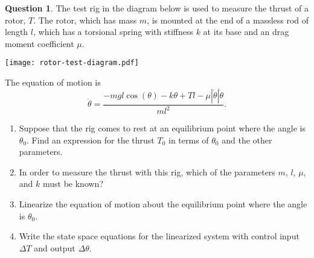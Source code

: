 \documentclass{article}
\theoremstyle{definition}
\newtheorem{question}{Question}
\begin{document}
\clearpage 

\begin{question}
    The test rig in the diagram below is used to measure the thrust of a rotor, $T$. The rotor, which has mass $m$, is mounted at the end of a massless rod of length $l$, which has a torsional spring with stiffness $k$ at its base and an drag moment coefficient $\mu$.
\begin{center}
\texttt{[image: rotor-test-diagram.pdf]}
\end{center}
The equation of motion is
\begin{equation}
    \ddot{\theta} = \frac{-mgl\cos(\theta) - k\theta + Tl - \mu |\dot{\theta}|\dot{\theta}}{ml^2} \text{.}
\end{equation}

\begin{enumerate}[label=(\Alph*)]
    \item Suppose that the rig comes to rest at an equilibrium point where the angle is $\theta_0$. Find an expression for the thrust $T_0$ in terms of $\theta_0$ and the other parameters.
    \item In order to measure the thrust with this rig, which of the parameters $m$, $l$, $\mu$, and $k$ must be known?
    \item Linearize the equation of motion about the equilibrium point where the angle is $\theta_0$.
    \item Write the state space equations for the linearized system with control input $\Delta T$ and output $\Delta \theta$.
\end{enumerate}
\end{question}


\vspace{0.1cm}
\end{document}
